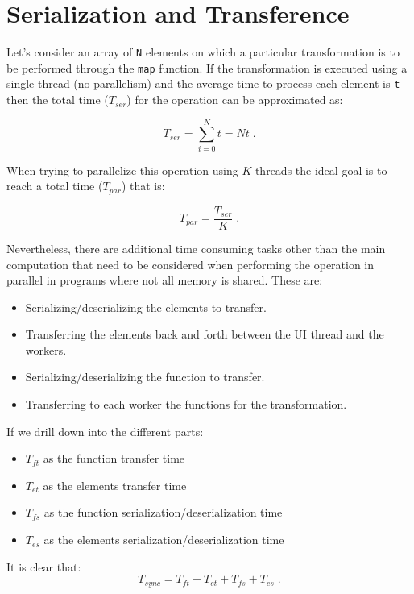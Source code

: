 \documentclass[runningheads,a4paper]{llncs}
\begin{document}
\section{Serialization and Transference}
Let's consider an array of \verb+N+ elements on which a particular transformation is to be performed through the \verb+map+ function. If the transformation is executed using a single thread (no parallelism) and the average time to process each element is \verb+t+ then the total time (\(T_{ser}\)) for the operation can be approximated as:

\begin{equation}
  T_{ser} = \sum_{i = 0}^{N}t = Nt \;  .
\end{equation}

When trying to parallelize this operation using \(K\) threads the ideal goal is to reach a total time (\(T_{par}\)) that is:

\begin{equation}
  T_{par} = \frac{T_{ser}}{K} \;  .
\end{equation}

Nevertheless, there are additional time consuming tasks other than the main computation that need to be considered when performing the operation in parallel in programs where not all memory is shared. These are:
\begin{itemize}
  \item Serializing/deserializing the elements to transfer.
  \item Transferring the elements back and forth between the UI thread and the workers.
  \item Serializing/deserializing the function to transfer.
  \item Transferring to each worker the functions for the transformation.
\end{itemize}

If we drill down into the different parts:
\begin{itemize}
  \item \(T_{ft}\) as the function transfer time
  \item \(T_{et}\) as the elements transfer time
  \item \(T_{fs}\) as the function serialization/deserialization time
  \item \(T_{es}\) as the elements serialization/deserialization time
\end{itemize}

It is clear that:
\begin{equation}
  T_{sync} = T_{ft} + T_{et} + T_{fs} + T_{es} \;  .
  \label{eq-tsync}
\end{equation}
\end{document}
